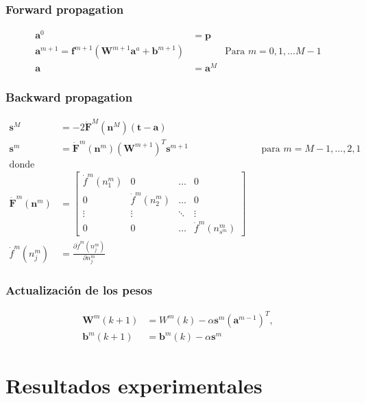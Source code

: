 \documentclass[12pt, titlepage]{article}
\begin{document}
\subsubsection{Forward propagation}
\begin{align*}
 \boldsymbol{a}^0 &= \boldsymbol{p} \\
 \boldsymbol{a}^{m+1} = 
\boldsymbol{f}^{m+1}(\boldsymbol{W}^{m+1}\boldsymbol{a}^{a}+\boldsymbol{b}^{m+1}
) & & \text{Para $m=0, 1, \ldots M-1$} \\
 \boldsymbol{a} &= \boldsymbol{a}^{M}
\end{align*}
\subsubsection{Backward propagation}
\begin{align*}
    \boldsymbol{s}^M &= 
-2\boldsymbol{\dot{F}}^{M}(\boldsymbol{n}^{M})(\boldsymbol{t-a}) \\
    \boldsymbol{s}^{m} &= 
\boldsymbol{\dot{F}}^{m}(\boldsymbol{n}^{m})(\boldsymbol{W}^{m+1})^{T}
\boldsymbol{s}^{m+1} & & \text{para $m=M-1, \ldots, 2, 1$} \\
\text{donde} \\
\boldsymbol{\dot{F}}^{m}(\boldsymbol{n}^{m}) &=
\begin{bmatrix}
  \dot{f}^{m}(n_{1}^{m}) & 0 & \ldots & 0 \\
  0 & \dot{f}^{m}(n_{2}^{m}) & \ldots & 0 \\
  \vdots & \vdots & \ddots & \vdots \\
  0 & 0 & \ldots & \dot{f}^{m}(n_{s^{m}}^{m})
\end{bmatrix} \\
\dot{f}^{m}(n_{j}^{m}) &= 
\frac{\partial \dot{f}^{m}(n_{j}^{m})}{\partial n_{j}^{m}}
\end{align*}
\subsubsection{Actualización de los pesos}
\begin{align*}
    \boldsymbol{W}^{m}(k+1) &= W^{m}(k)-\alpha 
\boldsymbol{s}^{m}(\boldsymbol{a}^{m-1})^{T}, \\
\boldsymbol{b}^{m}(k+1) &= \boldsymbol{b}^{m}(k) - \alpha \boldsymbol{s}^{m}
\end{align*}

\section{Resultados experimentales}
\end{document}
